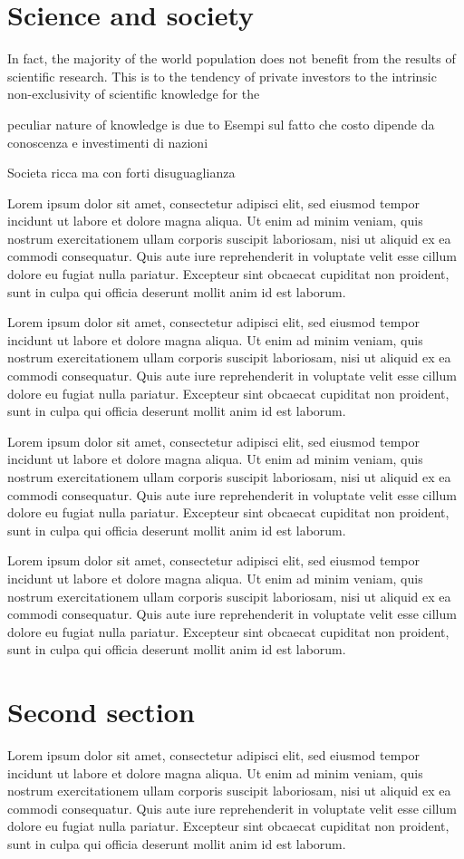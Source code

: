 \section{Science and society}

In fact, the majority of the world population does not benefit from the results of scientific research. This is  to the tendency of private investors to the intrinsic non-exclusivity of scientific knowledge for the

peculiar nature of knowledge is due to Esempi sul fatto che costo dipende da conoscenza e investimenti di nazioni

Societa ricca ma con forti disuguaglianza

Lorem ipsum dolor sit amet, consectetur adipisci elit, sed eiusmod tempor incidunt ut labore et dolore magna aliqua. Ut enim ad minim veniam, quis nostrum exercitationem ullam corporis suscipit laboriosam, nisi ut aliquid ex ea commodi consequatur. Quis aute iure reprehenderit in voluptate velit esse cillum dolore eu fugiat nulla pariatur. Excepteur sint obcaecat cupiditat non proident, sunt in culpa qui officia deserunt mollit anim id est laborum.

Lorem ipsum dolor sit amet, consectetur adipisci elit, sed eiusmod tempor incidunt ut labore et dolore magna aliqua. Ut enim ad minim veniam, quis nostrum exercitationem ullam corporis suscipit laboriosam, nisi ut aliquid ex ea commodi consequatur. Quis aute iure reprehenderit in voluptate velit esse cillum dolore eu fugiat nulla pariatur. Excepteur sint obcaecat cupiditat non proident, sunt in culpa qui officia deserunt mollit anim id est laborum.

Lorem ipsum dolor sit amet, consectetur adipisci elit, sed eiusmod tempor incidunt ut labore et dolore magna aliqua. Ut enim ad minim veniam, quis nostrum exercitationem ullam corporis suscipit laboriosam, nisi ut aliquid ex ea commodi consequatur. Quis aute iure reprehenderit in voluptate velit esse cillum dolore eu fugiat nulla pariatur. Excepteur sint obcaecat cupiditat non proident, sunt in culpa qui officia deserunt mollit anim id est laborum.

Lorem ipsum dolor sit amet, consectetur adipisci elit, sed eiusmod tempor incidunt ut labore et dolore magna aliqua. Ut enim ad minim veniam, quis nostrum exercitationem ullam corporis suscipit laboriosam, nisi ut aliquid ex ea commodi consequatur. Quis aute iure reprehenderit in voluptate velit esse cillum dolore eu fugiat nulla pariatur. Excepteur sint obcaecat cupiditat non proident, sunt in culpa qui officia deserunt mollit anim id est laborum.

\section{Second section}
Lorem ipsum dolor sit amet, consectetur adipisci elit, sed eiusmod tempor incidunt ut labore et dolore magna aliqua. Ut enim ad minim veniam, quis nostrum exercitationem ullam corporis suscipit laboriosam, nisi ut aliquid ex ea commodi consequatur. Quis aute iure reprehenderit in voluptate velit esse cillum dolore eu fugiat nulla pariatur. Excepteur sint obcaecat cupiditat non proident, sunt in culpa qui officia deserunt mollit anim id est laborum.